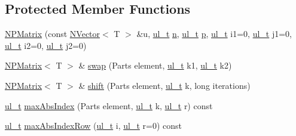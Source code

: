 \subsection*{Protected Member Functions}
\begin{DoxyCompactItemize}
\item 
\mbox{\hyperlink{class_n_p_matrix_ab8c664f1aa435b8b1bb5e1fdd293423f}{N\+P\+Matrix}} (const \mbox{\hyperlink{class_n_vector}{N\+Vector}}$<$ T $>$ \&u, \mbox{\hyperlink{group___n_algebra_ga1b140a2034db3f5dfe18a987745df43a}{ul\+\_\+t}} \mbox{\hyperlink{class_n_p_matrix_afc181b7652d9427125c72c38d7c1498d}{n}}, \mbox{\hyperlink{group___n_algebra_ga1b140a2034db3f5dfe18a987745df43a}{ul\+\_\+t}} \mbox{\hyperlink{class_n_p_matrix_a3beee8acb5babf62d2b4f212ac5d18e8}{p}}, \mbox{\hyperlink{group___n_algebra_ga1b140a2034db3f5dfe18a987745df43a}{ul\+\_\+t}} i1=0, \mbox{\hyperlink{group___n_algebra_ga1b140a2034db3f5dfe18a987745df43a}{ul\+\_\+t}} j1=0, \mbox{\hyperlink{group___n_algebra_ga1b140a2034db3f5dfe18a987745df43a}{ul\+\_\+t}} i2=0, \mbox{\hyperlink{group___n_algebra_ga1b140a2034db3f5dfe18a987745df43a}{ul\+\_\+t}} j2=0)
\item 
\mbox{\hyperlink{class_n_p_matrix}{N\+P\+Matrix}}$<$ T $>$ \& \mbox{\hyperlink{class_n_p_matrix_aafbf2155265a070f3ae418828e40359e}{swap}} (Parts element, \mbox{\hyperlink{group___n_algebra_ga1b140a2034db3f5dfe18a987745df43a}{ul\+\_\+t}} k1, \mbox{\hyperlink{group___n_algebra_ga1b140a2034db3f5dfe18a987745df43a}{ul\+\_\+t}} k2)
\item 
\mbox{\hyperlink{class_n_p_matrix}{N\+P\+Matrix}}$<$ T $>$ \& \mbox{\hyperlink{class_n_p_matrix_a83118d4efa26372fd12bd0a2ce77f155}{shift}} (Parts element, \mbox{\hyperlink{group___n_algebra_ga1b140a2034db3f5dfe18a987745df43a}{ul\+\_\+t}} k, long iterations)
\item 
\mbox{\hyperlink{group___n_algebra_ga1b140a2034db3f5dfe18a987745df43a}{ul\+\_\+t}} \mbox{\hyperlink{class_n_p_matrix_a4bff3c9956c688973307fd9c627e0ebd}{max\+Abs\+Index}} (Parts element, \mbox{\hyperlink{group___n_algebra_ga1b140a2034db3f5dfe18a987745df43a}{ul\+\_\+t}} k, \mbox{\hyperlink{group___n_algebra_ga1b140a2034db3f5dfe18a987745df43a}{ul\+\_\+t}} r) const
\item 
\mbox{\hyperlink{group___n_algebra_ga1b140a2034db3f5dfe18a987745df43a}{ul\+\_\+t}} \mbox{\hyperlink{class_n_p_matrix_a332d3f82121d71e1e349aa450af39207}{max\+Abs\+Index\+Row}} (\mbox{\hyperlink{group___n_algebra_ga1b140a2034db3f5dfe18a987745df43a}{ul\+\_\+t}} i, \mbox{\hyperlink{group___n_algebra_ga1b140a2034db3f5dfe18a987745df43a}{ul\+\_\+t}} r=0) const

\end{DoxyCompactItemize}
